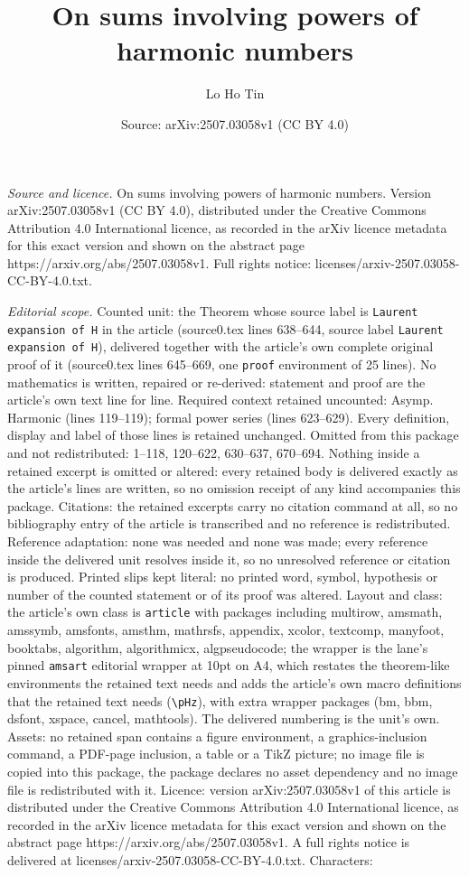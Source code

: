 \documentclass[10pt,a4paper]{amsart}
\title[On sums involving powers of harmonic numbers]{On sums involving powers of harmonic numbers}
\author{Lo Ho Tin}
\date{Source: arXiv:2507.03058v1 (CC BY 4.0)}
\begin{document}
\maketitle

\noindent\emph{Source and licence.} On sums involving powers of harmonic numbers. Version arXiv:2507.03058v1 (CC BY 4.0), distributed under the Creative Commons Attribution 4.0 International licence, as recorded in the arXiv licence metadata for this exact version and shown on the abstract page https://arxiv.org/abs/2507.03058v1. Full rights notice: licenses/arxiv-2507.03058-CC-BY-4.0.txt.\par\smallskip

\noindent\textit{Editorial scope.} Counted unit: the Theorem whose source label is \texttt{Laurent expansion of H} in the article (source0.tex lines 638--644, source label \texttt{Laurent expansion of H}), delivered together with the article's own complete original proof of it (source0.tex lines 645--669, one \texttt{proof} environment of 25 lines). No mathematics is written, repaired or re-derived: statement and proof are the article's own text line for line. Required context retained uncounted: Asymp. Harmonic (lines 119--119); formal power series (lines 623--629). Every definition, display and label of those lines is retained unchanged. Omitted from this package and not redistributed: 1--118, 120--622, 630--637, 670--694. Nothing inside a retained excerpt is omitted or altered: every retained body is delivered exactly as the article's lines are written, so no omission receipt of any kind accompanies this package. Citations: the retained excerpts carry no citation command at all, so no bibliography entry of the article is transcribed and no reference is redistributed. Reference adaptation: none was needed and none was made; every reference inside the delivered unit resolves inside it, so no unresolved reference or citation is produced. Printed slips kept literal: no printed word, symbol, hypothesis or number of the counted statement or of its proof was altered. Layout and class: the article's own class is \texttt{article} with packages including multirow, amsmath, amssymb, amsfonts, amsthm, mathrsfs, appendix, xcolor, textcomp, manyfoot, booktabs, algorithm, algorithmicx, algpseudocode; the wrapper is the lane's pinned \texttt{amsart} editorial wrapper at 10pt on A4, which restates the theorem-like environments the retained text needs and adds the article's own macro definitions that the retained text needs (\texttt{\textbackslash pHz}), with extra wrapper packages (bm, bbm, dsfont, xspace, cancel, mathtools). The delivered numbering is the unit's own. Assets: no retained span contains a figure environment, a graphics-inclusion command, a PDF-page inclusion, a table or a TikZ picture; no image file is copied into this package, the package declares no asset dependency and no image file is redistributed with it. Licence: version arXiv:2507.03058v1 of this article is distributed under the Creative Commons Attribution 4.0 International licence, as recorded in the arXiv licence metadata for this exact version and shown on the abstract page https://arxiv.org/abs/2507.03058v1. A full rights notice is delivered at licenses/arxiv-2507.03058-CC-BY-4.0.txt. Characters: 
\end{document}
